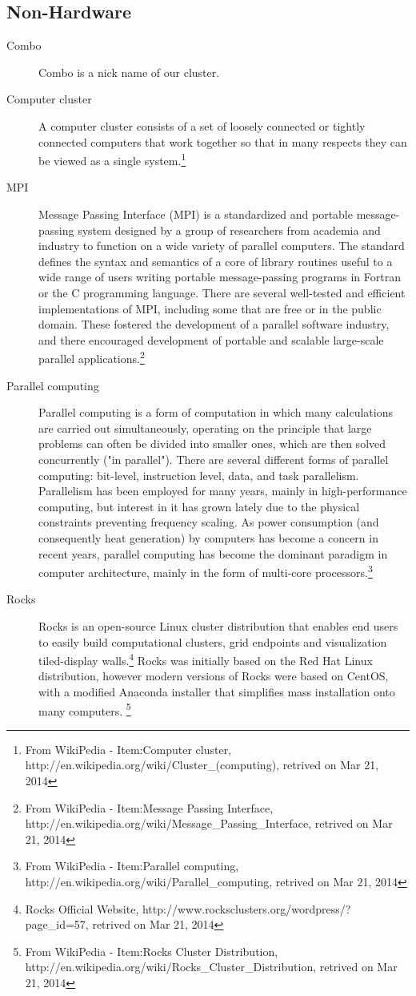 \subsection{Non-Hardware}
\begin{description}
\item[Combo] Combo is a nick name of our cluster.
\item[Computer cluster] A computer cluster consists of a set of loosely connected or tightly connected computers that work together so that in many respects they can be viewed as a single system.\footnote{From WikiPedia - Item:Computer cluster, http://en.wikipedia.org/wiki/Cluster\_(computing), retrived on Mar 21, 2014}
\item[MPI] Message Passing Interface (MPI) is a standardized and portable message-passing system designed by a group of researchers from academia and industry to function on a wide variety of parallel computers. The standard defines the syntax and semantics of a core of library routines useful to a wide range of users writing portable message-passing programs in Fortran or the C programming language. There are several well-tested and efficient implementations of MPI, including some that are free or in the public domain. These fostered the development of a parallel software industry, and there encouraged development of portable and scalable large-scale parallel applications.\footnote{From WikiPedia - Item:Message Passing Interface, http://en.wikipedia.org/wiki/Message\_Passing\_Interface, retrived on Mar 21, 2014}
\item[Parallel computing] Parallel computing is a form of computation in which many calculations are carried out simultaneously, operating on the principle that large problems can often be divided into smaller ones, which are then solved concurrently ("in parallel"). There are several different forms of parallel computing: bit-level, instruction level, data, and task parallelism. Parallelism has been employed for many years, mainly in high-performance computing, but interest in it has grown lately due to the physical constraints preventing frequency scaling. As power consumption (and consequently heat generation) by computers has become a concern in recent years, parallel computing has become the dominant paradigm in computer architecture, mainly in the form of multi-core processors.\footnote{From WikiPedia - Item:Parallel computing, http://en.wikipedia.org/wiki/Parallel\_computing, retrived on Mar 21, 2014}
\item[Rocks] Rocks is an open-source Linux cluster distribution that enables end users to easily build computational clusters, grid endpoints and visualization tiled-display walls.\footnote{Rocks Official Website, http://www.rocksclusters.org/wordpress/?page\_id=57, retrived on Mar 21, 2014} Rocks was initially based on the Red Hat Linux distribution, however modern versions of Rocks were based on CentOS, with a modified Anaconda installer that simplifies mass installation onto many computers. \footnote{From WikiPedia - Item:Rocks Cluster Distribution, http://en.wikipedia.org/wiki/Rocks\_Cluster\_Distribution, retrived on Mar 21, 2014}
\end{description}

